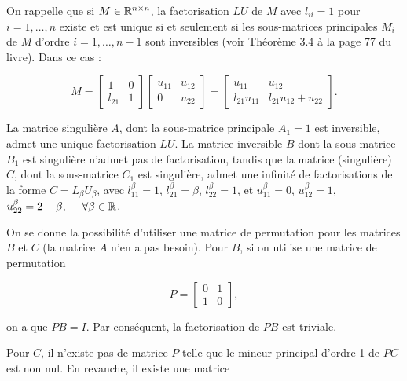 On rappelle que si $M \in \mathbb{R}^{n \times n}$, la factorisation $LU$ de $M$ avec $l_{ii} = 1$ pour $i = 1, \dots , n$ existe et est unique si et seulement si les sous-matrices principales $M_{i}$ de $M$ d'ordre $i = 1, \dots , n - 1$ sont inversibles (voir Théorème 3.4 à la page 77 du livre).
Dans ce cas :

\begin{equation*}
  M = \begin{bmatrix}
        1       & 0   \\
        l_{21}  & 1
      \end{bmatrix}
      \begin{bmatrix}
        u_{11} & u_{12}   \\
        0      & u_{22}
      \end{bmatrix}
  =
      \begin{bmatrix}
        u_{11}          & u_{12}   \\
        l_{21} u_{11}   & l_{21} u_{12} + u_{22}
      \end{bmatrix}
  .
\end{equation*}

La matrice singulière $A$, dont la sous-matrice principale $A_{1} = 1$ est inversible, admet une unique factorisation $LU$.
La matrice inversible $B$ dont la sous-matrice $B_{1}$ est singulière n'admet pas de factorisation,
tandis que la matrice (singulière) $C$, dont la sous-matrice $C_{1}$ est singulière, admet une infinité de factorisations de la forme $C = L_{\beta} U_{\beta}$,
avec $l^{\beta}_{11} = 1$, $l^{\beta}_{21} = \beta$, $l^{\beta}_{22} = 1$, et $u^{\beta}_{11} = 0$, $u^{\beta}_{12} = 1$, $u^{\beta}_{22} = 2 - \beta, \ \quad \forall \beta \in \mathbb{R}$.

On se donne la possibilité d'utiliser une matrice de permutation pour les matrices $B$ et $C$ (la matrice $A$ n'en a pas besoin).
Pour $B$, si on utilise une matrice de permutation 

\begin{equation*}
  P = \begin{bmatrix}
        0 & 1   \\
        1 & 0
      \end{bmatrix}
      ,
\end{equation*}

on a que $PB = I$.
Par conséquent, la factorisation de $PB$ est triviale.

Pour $C$, il n'existe pas de matrice $P$ telle que le mineur principal d'ordre 1 de $PC$ est non nul.
En revanche, il existe une matrice

